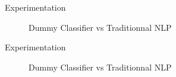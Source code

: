 \begin{frame}[label=exp]{Experimentation}
	
	\begin{figure}
		\caption{Dummy Classifier vs Traditionnal NLP}
		\centering
	\end{figure}
	
\end{frame}




\begin{frame}[label=exp]{Experimentation}
	\begin{figure}
		\caption{Dummy Classifier vs Traditionnal NLP}
		\centering
	\end{figure}
	
\end{frame}




